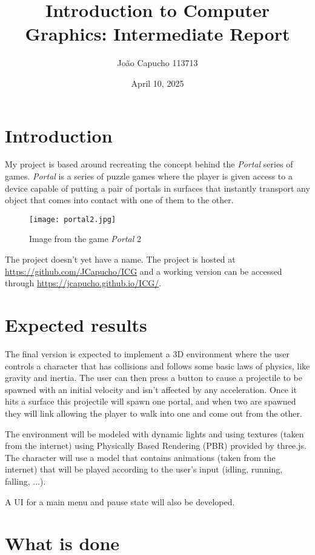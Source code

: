 \documentclass{article}
\title{Introduction to Computer Graphics: Intermediate Report}
\author{João Capucho 113713}
\date{April 10, 2025}
\begin{document}
\maketitle

\section*{Introduction}

My project is based around recreating the concept behind the \emph{Portal}
series of games. \emph{Portal} is a series of puzzle games where the player is
given access to a device capable of putting a pair of portals in surfaces that
instantly transport any object that comes into contact with one of them to the
other.

\begin{figure}[h]
	\centering
	\texttt{[image: portal2.jpg]}
	\caption{Image from the game \emph{Portal} 2}
\end{figure}

The project doesn't yet have a name. The project is hosted at
\url{https://github.com/JCapucho/ICG} and a working version can be accessed
through \url{https://jcapucho.github.io/ICG/}.

\section*{Expected results}

The final version is expected to implement a 3D environment where the user
controls a character that has collisions and follows some basic laws of
physics, like gravity and inertia. The user can then press a button to cause a
projectile to be spawned with an initial velocity and isn't affected by any
acceleration. Once it hits a surface this projectile will spawn one portal, and
when two are spawned they will link allowing the player to walk into one and
come out from the other.

The environment will be modeled with dynamic lights and using textures (taken
from the internet) using Physically Based Rendering (PBR) provided by three.js.
The character will use a model that contains animations (taken from the
internet) that will be played according to the user's input (idling, running,
falling, ...).

A UI for a main menu and pause state will also be developed.

\section*{What is done}
\end{document}
